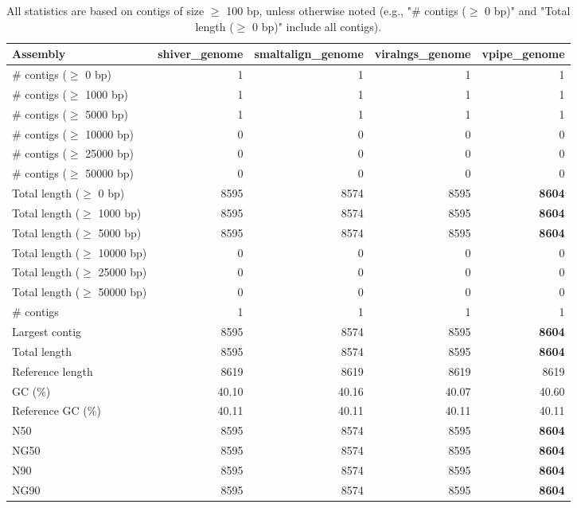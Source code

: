 \documentclass[12pt,a4paper]{article}
\begin{document}
\begin{table}[ht]
\begin{center}
\caption{All statistics are based on contigs of size $\geq$ 100 bp, unless otherwise noted (e.g., "\# contigs ($\geq$ 0 bp)" and "Total length ($\geq$ 0 bp)" include all contigs).}
\begin{tabular}{|l*{4}{|r}|}
\hline
Assembly & shiver\_genome & smaltalign\_genome & viralngs\_genome & vpipe\_genome \\ \hline
\# contigs ($\geq$ 0 bp) & 1 & 1 & 1 & 1 \\ \hline
\# contigs ($\geq$ 1000 bp) & 1 & 1 & 1 & 1 \\ \hline
\# contigs ($\geq$ 5000 bp) & 1 & 1 & 1 & 1 \\ \hline
\# contigs ($\geq$ 10000 bp) & 0 & 0 & 0 & 0 \\ \hline
\# contigs ($\geq$ 25000 bp) & 0 & 0 & 0 & 0 \\ \hline
\# contigs ($\geq$ 50000 bp) & 0 & 0 & 0 & 0 \\ \hline
Total length ($\geq$ 0 bp) & 8595 & 8574 & 8595 & {\bf 8604} \\ \hline
Total length ($\geq$ 1000 bp) & 8595 & 8574 & 8595 & {\bf 8604} \\ \hline
Total length ($\geq$ 5000 bp) & 8595 & 8574 & 8595 & {\bf 8604} \\ \hline
Total length ($\geq$ 10000 bp) & 0 & 0 & 0 & 0 \\ \hline
Total length ($\geq$ 25000 bp) & 0 & 0 & 0 & 0 \\ \hline
Total length ($\geq$ 50000 bp) & 0 & 0 & 0 & 0 \\ \hline
\# contigs & 1 & 1 & 1 & 1 \\ \hline
Largest contig & 8595 & 8574 & 8595 & {\bf 8604} \\ \hline
Total length & 8595 & 8574 & 8595 & {\bf 8604} \\ \hline
Reference length & 8619 & 8619 & 8619 & 8619 \\ \hline
GC (\%) & 40.10 & 40.16 & 40.07 & 40.60 \\ \hline
Reference GC (\%) & 40.11 & 40.11 & 40.11 & 40.11 \\ \hline
N50 & 8595 & 8574 & 8595 & {\bf 8604} \\ \hline
NG50 & 8595 & 8574 & 8595 & {\bf 8604} \\ \hline
N90 & 8595 & 8574 & 8595 & {\bf 8604} \\ \hline
NG90 & 8595 & 8574 & 8595 & {\bf 8604} \\ \hline

\end{tabular}
\end{center}
\end{table}
\end{document}
